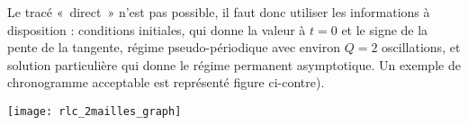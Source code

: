 \documentclass[../TDE4-E5.tex]{subfiles}%
\begin{document}
{	\noindent
	\begin{minipage}[c]{.48\linewidth}
		Le tracé «~direct~» n'est pas possible, il faut donc utiliser les
		informations à disposition : conditions initiales, qui donne la valeur à $t
			= 0$ et le signe de la pente de la tangente, régime pseudo-périodique avec
		environ $Q = 2$ oscillations, et solution particulière qui donne le régime
		permanent asymptotique. Un exemple de chronogramme acceptable est représenté
		figure ci-contre).
	\end{minipage}
	\begin{minipage}[c]{.48\linewidth}
		\begin{center}
			\texttt{[image: rlc\_2mailles\_graph]}
		\end{center}
	\end{minipage}
}%
\end{document}
